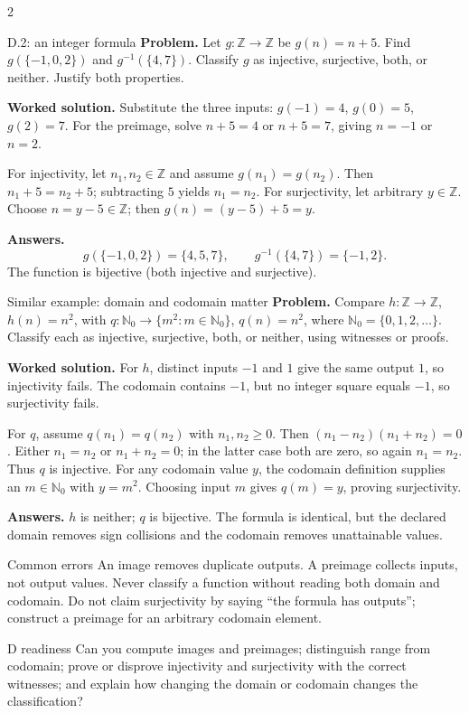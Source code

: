 \documentclass[10pt]{article}
\begin{document}
\begin{multicols}{2}
\begin{workedbox}{D.2: an integer formula}
\textbf{Problem.} Let $g:\mathbb Z\to\mathbb Z$ be $g(n)=n+5$.
Find $g(\{-1,0,2\})$ and $g^{-1}(\{4,7\})$. Classify $g$ as injective,
surjective, both, or neither. Justify both properties.

\textbf{Worked solution.} Substitute the three inputs:
$g(-1)=4$, $g(0)=5$, $g(2)=7$. For the preimage, solve $n+5=4$ or
$n+5=7$, giving $n=-1$ or $n=2$.

For injectivity, let $n_1,n_2\in\mathbb Z$ and assume $g(n_1)=g(n_2)$.
Then $n_1+5=n_2+5$; subtracting $5$ yields $n_1=n_2$.
For surjectivity, let arbitrary $y\in\mathbb Z$. Choose
$n=y-5\in\mathbb Z$; then $g(n)=(y-5)+5=y$.

\textbf{Answers.}
\[
g(\{-1,0,2\})=\{4,5,7\},\qquad g^{-1}(\{4,7\})=\{-1,2\}.
\]
The function is bijective (both injective and surjective).
\end{workedbox}

\begin{workedbox}{Similar example: domain and codomain matter}
\textbf{Problem.} Compare $h:\mathbb Z\to\mathbb Z$, $h(n)=n^2$, with
$q:\mathbb N_0\to\{m^2:m\in\mathbb N_0\}$, $q(n)=n^2$, where
$\mathbb N_0=\{0,1,2,\ldots\}$. Classify each as injective, surjective,
both, or neither, using witnesses or proofs.

\textbf{Worked solution.} For $h$, distinct inputs $-1$ and $1$ give the
same output $1$, so injectivity fails. The codomain contains $-1$, but no
integer square equals $-1$, so surjectivity fails.

For $q$, assume $q(n_1)=q(n_2)$ with $n_1,n_2\ge0$. Then
$(n_1-n_2)(n_1+n_2)=0$. Either $n_1=n_2$ or $n_1+n_2=0$; in the latter
case both are zero, so again $n_1=n_2$. Thus $q$ is injective. For any
codomain value $y$, the codomain definition supplies an $m\in\mathbb N_0$
with $y=m^2$. Choosing input $m$ gives $q(m)=y$, proving surjectivity.

\textbf{Answers.} $h$ is neither; $q$ is bijective. The formula is identical,
but the declared domain removes sign collisions and the codomain removes
unattainable values.
\end{workedbox}

\begin{warningbox}{Common errors}
An image removes duplicate outputs. A preimage collects inputs, not output
values. Never classify a function without reading both domain and codomain.
Do not claim surjectivity by saying ``the formula has outputs''; construct a
preimage for an arbitrary codomain element.
\end{warningbox}

\begin{checklistbox}{D readiness}
Can you compute images and preimages; distinguish range from codomain; prove or
disprove injectivity and surjectivity with the correct witnesses; and explain
how changing the domain or codomain changes the classification?
\end{checklistbox}
\end{multicols}
\end{document}

